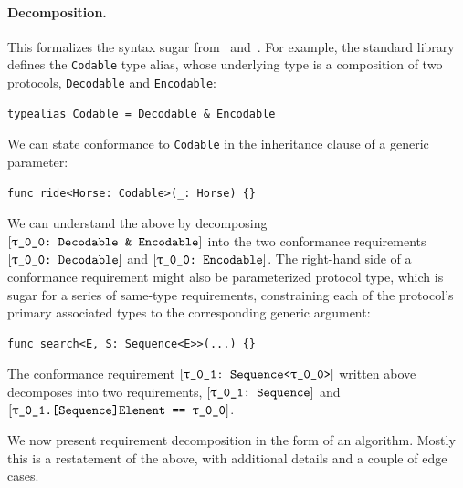 \documentclass[../generics]{subfiles}
\begin{document}
\paragraph{Decomposition.} This formalizes the syntax sugar from ~and~. For example, the standard library defines the \texttt{Codable} type alias, whose underlying type is a composition of two protocols, \texttt{Decodable} and \texttt{Encodable}:
\begin{Verbatim}
typealias Codable = Decodable & Encodable
\end{Verbatim}
We can state conformance to \texttt{Codable} in the inheritance clause of a generic parameter:
\begin{Verbatim}
func ride<Horse: Codable>(_: Horse) {}
\end{Verbatim}
We can understand the above by decomposing $\ConfReq{\rT}{Decodable \& Encodable}$ into the two conformance requirements $\ConfReq{\rT}{Decodable}$ and $\ConfReq{\rT}{Encodable}$. The right-hand side of a conformance requirement might also be parameterized protocol type, which is sugar for a series of same-type requirements, constraining each of the protocol's primary associated types to the corresponding generic argument:
\begin{Verbatim}
func search<E, S: Sequence<E>>(...) {}
\end{Verbatim}
The conformance requirement $\ConfReq{\rU}{Sequence<\rT>}$ written above decomposes into two requirements, $\rUSequence$ and $\SameReq{\rU.[Sequence]Element}{\rT}$.

We now present requirement decomposition in the form of an algorithm. Mostly this is a restatement of the above, with additional details and a couple of edge cases.
\end{document}

